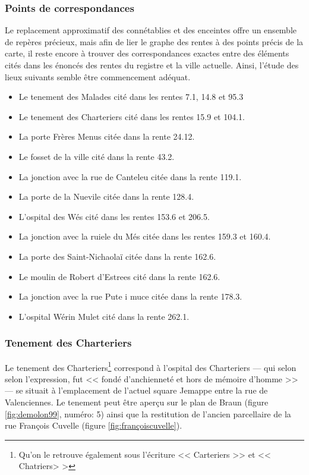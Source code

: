 \subsubsection{Points de correspondances}
Le replacement approximatif des connétablies et des enceintes offre un ensemble de repères précieux, mais afin de lier le graphe des rentes à des points précis de la carte, il reste encore à trouver des correspondances exactes entre des éléments cités dans les énoncés des rentes du registre et la ville actuelle. Ainsi, l'étude des lieux suivants semble être commencement adéquat.

\begin{itemize}
\item	Le tenement des Malades	cité dans les rentes 	7.1, 14.8 et 95.3
\item	Le tenement des Charteriers	cité dans les rentes 	15.9 et 104.1.
\item	La porte Frères Menus	citée dans la rente 	24.12.
\item	Le fosset de la ville	cité dans la rente 	43.2.
\item	La jonction avec la rue de Canteleu	citée dans la rente 	119.1.
\item	La porte de la Nuevile 	citée dans la rente	128.4.
\item	L'ospital des Wés	cité dans les rentes 	153.6 et 206.5.
\item	La jonction avec la ruiele du Més	citée dans les rentes 	159.3 et 160.4.
\item   La porte des Saint-Nichaolaï citée  dans la rente 162.6.
\item   Le moulin de Robert d'Estrees cité dans la rente 162.6.
\item	La jonction avec la rue Pute i muce	citée dans la rente	178.3.
\item	L'ospital Wérin Mulet cité dans la rente	262.1.
\end{itemize}


\subsubsection{Tenement des Charteriers}
Le tenement des Charteriers\footnote{Qu'on le retrouve également sous l'écriture << Carteriers >> et << Chatriers> >} correspond à l'ospital des Charteriers --- qui selon  selon l'expression, fut << fondé d'anchienneté et hors de mémoire d'homme >> --- se situait à l'emplacement de l'actuel square Jemappe entre la rue de Valenciennes. Le tenement peut être aperçu sur le plan de Braun (figure \ref{fig:demolon99}, numéro: 5) ainsi que la restitution de l'ancien parcellaire de la rue François Cuvelle (figure \ref{fig:françoiscuvelle}). 

